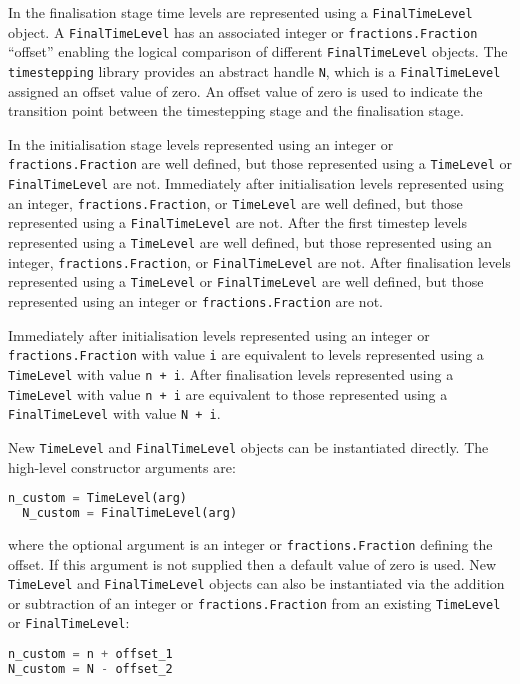 \documentclass[a4paper]{book}
\begin{document}
In the finalisation stage time levels are represented using a
\verb+FinalTimeLevel+ object. A \verb+FinalTimeLevel+ has an associated integer
or \verb+fractions.Fraction+ ``offset'' enabling the logical comparison of
different \verb+FinalTimeLevel+ objects. The \verb+timestepping+ library
provides an abstract handle \verb+N+, which is a \linebreak
\verb+FinalTimeLevel+ assigned an offset value of zero. An offset value of zero
is used to indicate the transition point between the timestepping stage and the
finalisation stage.

In the initialisation stage levels represented using an integer or \linebreak
\verb+fractions.Fraction+ are well defined, but those represented using a
\verb+TimeLevel+ or \verb+FinalTimeLevel+ are not. Immediately after
initialisation levels represented using an integer, \verb+fractions.Fraction+,
or \verb+TimeLevel+ are well defined, but those represented using a
\verb+FinalTimeLevel+ are not. After the first timestep levels represented using
a \verb+TimeLevel+ are well defined, but those represented using an integer,
\verb+fractions.Fraction+, or \verb+FinalTimeLevel+ are not. After finalisation
levels represented using a \verb+TimeLevel+ or \verb+FinalTimeLevel+ are well
defined, but those represented using an integer or \verb+fractions.Fraction+ are
not.

Immediately after initialisation levels represented using an integer or
\linebreak \verb+fractions.Fraction+ with value \verb+i+ are equivalent to
levels represented using a \verb+TimeLevel+ with value \verb=n + i=. After
finalisation levels represented using a \verb+TimeLevel+ with value \verb=n + i=
are equivalent to those represented using a \linebreak \verb+FinalTimeLevel+
with value \verb=N + i=.

New \verb+TimeLevel+ and \verb+FinalTimeLevel+ objects can be instantiated
directly. The high-level constructor arguments are:
\begin{lstlisting}[language = python, frame = single, basicstyle=\footnotesize]
  n_custom = TimeLevel(arg)
  N_custom = FinalTimeLevel(arg)
\end{lstlisting}
where the optional argument is an integer or \verb+fractions.Fraction+ defining
the offset. If this argument is not supplied then a default value of zero is
used. New \verb+TimeLevel+ and \verb+FinalTimeLevel+ objects can also be
instantiated via the addition or subtraction of an integer or
\verb+fractions.Fraction+ from an existing \verb+TimeLevel+ or
\verb+FinalTimeLevel+:
\begin{lstlisting}[language = python, frame = single, basicstyle=\footnotesize]
n_custom = n + offset_1
N_custom = N - offset_2
\end{lstlisting}
\end{document}
